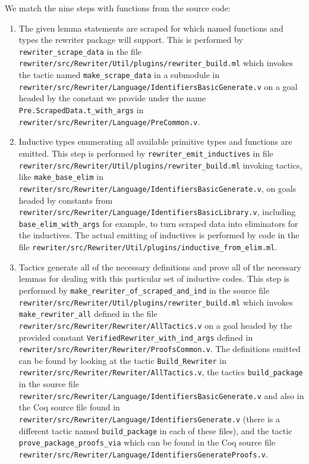 \documentclass[sigplan,10pt,review,anonymous]{acmart}\settopmatter{printfolios=true,printccs=false,printacmref=false}
\begin{document}
We match the nine steps with functions from the source code:
\begin{enumerate}
  \item
    The given lemma statements are scraped for which named functions and types the rewriter package will support.
    This is performed by \texttt{rewriter\_scrape\_data} in the file \texttt{rewriter/src/Rewriter/Util/plugins/rewriter\_build.ml} which invokes the tactic named \texttt{make\_scrape\_data} in a submodule in \texttt{rewriter/src/Rewriter/Language/IdentifiersBasicGenerate.v} on a goal headed by the constant we provide under the name \texttt{Pre.ScrapedData.t\_with\_args} in \texttt{rewriter/src/Rewriter/Language/PreCommon.v}.
  \item
    Inductive types enumerating all available primitive types and functions are emitted.
    This step is performed by \texttt{rewriter\_emit\_inductives} in file \texttt{rewriter/src/Rewriter/Util/plugins/rewriter\_build.ml} invoking tactics, like \texttt{make\_base\_elim} in \texttt{rewriter/src/Rewriter/Language/IdentifiersBasicGenerate.v}, on goals headed by constants from \texttt{rewriter/src/Rewriter/Language/IdentifiersBasicLibrary.v}, including \texttt{base\_elim\_with\_args} for example, to turn scraped data into eliminators for the inductives.
    The actual emitting of inductives is performed by code in the file \texttt{rewriter/src/Rewriter/Util/plugins/inductive\_from\_elim.ml}.
  \item
    Tactics generate all of the necessary definitions and prove all of the necessary lemmas for dealing with this particular set of inductive codes.
    This step is performed by \texttt{make\_rewriter\_of\_scraped\_and\_ind} in the source file \texttt{rewriter/src/Rewriter/Util/plugins/rewriter\_build.ml} which invokes \texttt{make\_rewriter\_all} defined in the file \texttt{rewriter/src/Rewriter/Rewriter/AllTactics.v} on a goal headed by the provided constant \texttt{VerifiedRewriter\_with\_ind\_args} defined in \texttt{rewriter/src/Rewriter/Rewriter/ProofsCommon.v}.
    The definitions emitted can be found by looking at the tactic \texttt{Build\_Rewriter} in \texttt{rewriter/src/Rewriter/Rewriter/AllTactics.v}, the tactics \texttt{build\_package} in the source file \texttt{rewriter/src/Rewriter/Language/IdentifiersBasicGenerate.v} and also in the Coq source file found in \texttt{rewriter/src/Rewriter/Language/IdentifiersGenerate.v} (there is a different tactic named \texttt{build\_package} in each of these files), and the tactic \texttt{prove\_package\_proofs\_via} which can be found in the Coq source file \texttt{rewriter/src/Rewriter/Language/IdentifiersGenerateProofs.v}.

\end{enumerate}
\end{document}
